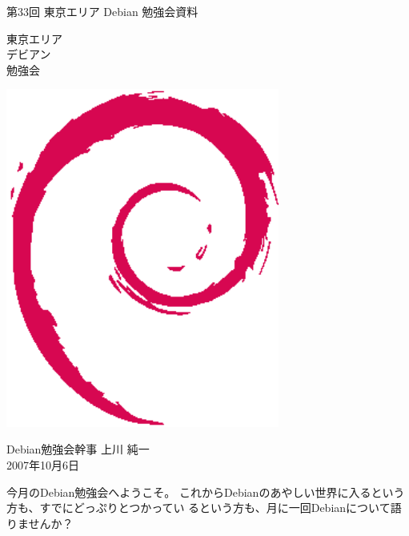 \documentclass[mingoth,a4paper]{jsarticle}
\newcommand{\debmtgyear}{2007}
\newcommand{\debmtgdate}{6}
\newcommand{\debmtgmonth}{10}
\newcommand{\debmtgnumber}{33}
\begin{document}
\begin{titlepage}


 第\debmtgnumber{}回 東京エリア Debian 勉強会資料

\vspace{2cm}

\begin{minipage}[t]{0.6\hsize}
\vspace{-2cm}
{\fontsize{60}{60}
{\gt
\color{dancerdarkblue}
東京エリア \\
デビアン \\
勉強会
}}
\end{minipage}
\begin{minipage}[b]{0.4\hsize}
\hspace{-1cm}\includegraphics[width=9cm]{image200502/openlogo-nd.eps}
\end{minipage}

\vspace{3cm}
\hfill{}Debian勉強会幹事 上川 純一\\
\hfill{}\debmtgyear{}年\debmtgmonth{}月\debmtgdate{}日

\thispagestyle{empty}
\end{titlepage}



今月のDebian勉強会へようこそ。
 これからDebianのあやしい世界に入るという方も、すでにどっぷりとつかってい
 るという方も、月に一回Debianについて語りませんか？
\end{document}
